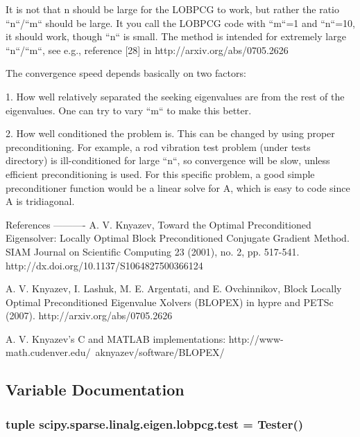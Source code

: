 \begin{DoxyVerb}
It is not that n should be large for the LOBPCG to work, but rather the
ratio ``n``/``m`` should be large. It you call the LOBPCG code with ``m``=1
and ``n``=10, it should work, though ``n`` is small. The method is intended
for extremely large ``n``/``m``, see e.g., reference [28] in
http://arxiv.org/abs/0705.2626

The convergence speed depends basically on two factors:

1.  How well relatively separated the seeking eigenvalues are from the rest of
    the eigenvalues. One can try to vary ``m`` to make this better.

2.  How well conditioned the problem is. This can be changed by using proper
    preconditioning. For example, a rod vibration test problem (under tests
    directory) is ill-conditioned for large ``n``, so convergence will be
    slow, unless efficient preconditioning is used. For this specific problem,
    a good simple preconditioner function would be a linear solve for A, which
    is easy to code since A is tridiagonal.


References
----------
A. V. Knyazev, Toward the Optimal Preconditioned Eigensolver: Locally Optimal
Block Preconditioned Conjugate Gradient Method. SIAM Journal on Scientific
Computing 23 (2001), no. 2,
pp. 517-541. http://dx.doi.org/10.1137/S1064827500366124

A. V. Knyazev, I. Lashuk, M. E. Argentati, and E. Ovchinnikov, Block Locally
Optimal Preconditioned Eigenvalue Xolvers (BLOPEX) in hypre and PETSc
(2007). http://arxiv.org/abs/0705.2626

A. V. Knyazev's C and MATLAB implementations:
http://www-math.cudenver.edu/~aknyazev/software/BLOPEX/\end{DoxyVerb}
 

\subsection{Variable Documentation}
\hypertarget{namespacescipy_1_1sparse_1_1linalg_1_1eigen_1_1lobpcg_aed10e2e58b3041c33747b93d50fee16d}{}
\subsubsection[{test}]{\setlength{\rightskip}{0pt plus 5cm}tuple scipy.\+sparse.\+linalg.\+eigen.\+lobpcg.\+test = Tester()}\label{namespacescipy_1_1sparse_1_1linalg_1_1eigen_1_1lobpcg_aed10e2e58b3041c33747b93d50fee16d}
